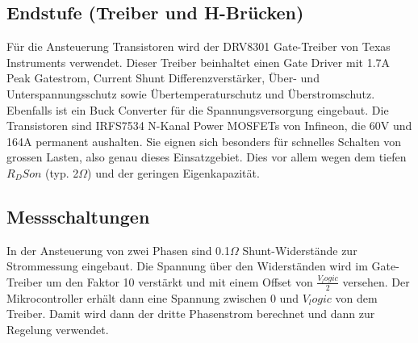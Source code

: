 \subsection*{Endstufe (Treiber und H-Brücken)}
Für die Ansteuerung Transistoren wird der DRV8301 Gate-Treiber von Texas Instruments verwendet. Dieser Treiber beinhaltet einen Gate Driver mit 1.7A Peak Gatestrom, Current Shunt Differenzverstärker, Über- und Unterspannungsschutz sowie Übertemperaturschutz und Überstromschutz. Ebenfalls ist ein Buck Converter für die Spannungsversorgung eingebaut.
Die Transistoren sind IRFS7534 N-Kanal Power MOSFETs von Infineon, die 60V und 164A permanent aushalten. Sie eignen sich besonders für schnelles Schalten von grossen Lasten, also genau dieses Einsatzgebiet. Dies vor allem wegen dem tiefen $R_DSon$ (typ. 2\(\Omega\)) und der geringen Eigenkapazität. 

\subsection*{Messschaltungen}
In der Ansteuerung von zwei Phasen sind 0.1\(\Omega\) Shunt-Widerstände zur Strommessung eingebaut. Die Spannung über den Widerständen wird im Gate-Treiber um den Faktor 10 verstärkt und mit einem Offset von $\frac{V_logic}{2}$ versehen. Der Mikrocontroller erhält dann eine Spannung zwischen 0 und $V_logic$ von dem Treiber. Damit wird dann der dritte Phasenstrom berechnet und dann zur Regelung verwendet.
